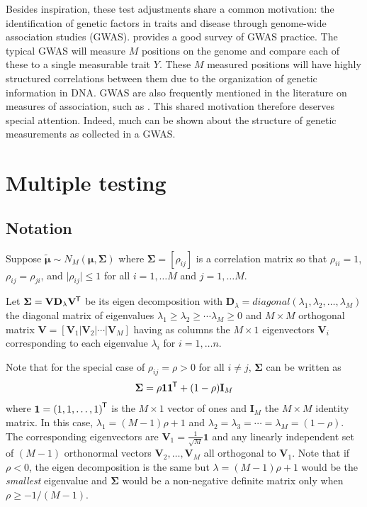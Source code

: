 \documentclass[letterpaper,12pt,oneside,final]{article}
\newcommand{\ve}[1]{\mathbf{#1}}           %
\newcommand{\sv}[1]{\boldsymbol{#1}}   %
\newcommand{\m}[1]{\mathbf{#1}}               %
\newcommand{\sm}[1]{\boldsymbol{#1}}   %
\newcommand{\tr}[1]{{#1}^{\mkern-1.5mu\mathsf{T}}}              %
\newcommand{\abs}[1]{\lvert{#1}\rvert}              %
\newcommand{\bigwig}[1]{\widetilde{#1}}
\newcommand{\follows}{\sim}
\begin{document}
Besides inspiration, these test adjustments share a common motivation: the identification of genetic factors in traits and disease through genome-wide association studies (GWAS). \cite{uffelmannetal2021gwas} provides a good survey of GWAS practice. The typical GWAS will measure $M$ positions on the genome and compare each of these to a single measurable trait $Y$. These $M$ measured positions will have highly structured correlations between them due to the organization of genetic information in DNA. GWAS are also frequently mentioned in the literature on measures of association, such as \cite{reshef2011MIC, liuetal2018kernel}. This shared motivation therefore deserves special attention. Indeed, much can be shown about the structure of genetic measurements as collected in a GWAS.

\section{Multiple testing}

\subsection{Notation}

Suppose $\bigwig{\sv{\mu}} \follows N_M (\sv{\mu}, \sm{\Sigma})$ where $\sm{\Sigma} = [\rho_{ij}]$ is a correlation matrix so that $\rho_{ii} = 1$, $ \rho_{ij} = \rho_{ji}$, and $\abs{\rho_{ij}} \le 1$ for all $i = 1, \ldots M$ and $j = 1, \ldots M$.

Let $\sm{\Sigma} = \m{V} \m{D}_\lambda \tr{\m{V}}$ be its eigen decomposition with 
$\m{D}_\lambda = diagonal(\lambda_1, \lambda_2, \ldots, \lambda_M)$ 
the diagonal matrix of eigenvalues $\lambda_1 \ge \lambda_2 \ge \cdots \lambda_M \ge 0$
and $M \times M$ orthogonal matrix
$\m{V} = [\ve{V}_1 | \ve{V}_2 | \cdots | \ve{V}_M]$ having as columns the $M \times 1$ eigenvectors $\ve{V}_i$ corresponding to each eigenvalue $\lambda_i$ for $i = 1, \ldots n$.

Note that for the special case of $\rho_{ij} = \rho > 0$ for all $i \ne j$, $\sm{\Sigma}$ can be written as
\begin{equation}
 \sm{\Sigma} = \rho \ve{1} \tr{\ve{1}} + (1 - \rho) \m{I}_M 
\label{eq:multipleTesting:commonCor}
\end{equation}
where $\ve{1} = \tr{(1, 1, \ldots, 1)}$ is the $M \times 1$ vector of ones and $\m{I}_M$ the $M \times M$ identity matrix.  In this case, $\lambda_ 1 = (M - 1) \rho + 1$ and $\lambda_2 = \lambda_3 = \cdots = \lambda_M = (1 - \rho)$.  The corresponding eigenvectors  are $\ve{V}_1 = \frac{1}{\sqrt{M}} \ve{1}$ and any linearly independent set of $(M - 1)$ orthonormal vectors $\ve{V}_2, \ldots, \ve{V}_M$ all orthogonal to $\ve{V}_1$.  
Note that if $\rho < 0$, the eigen decomposition is the same but $\lambda = (M-1)\rho +1$ would be the \emph{smallest} eigenvalue and $\sm{\Sigma}$ would be a non-negative definite matrix only when $\rho \ge -1/(M-1)$.
\end{document}
